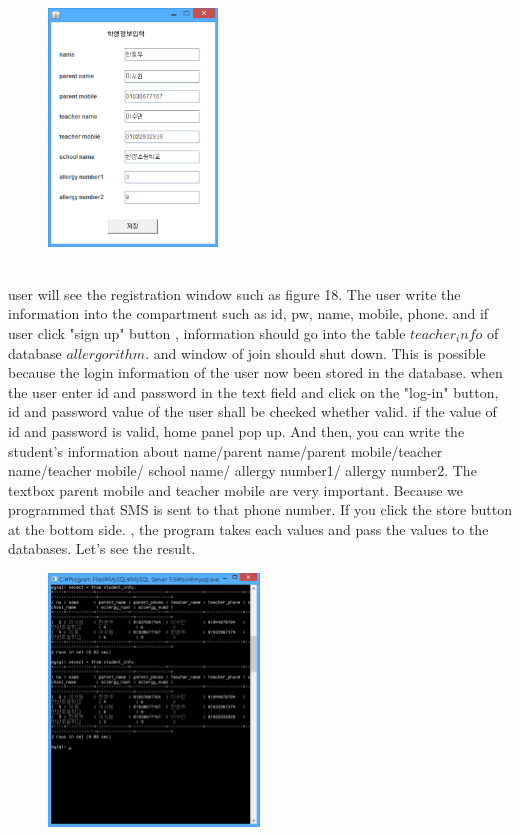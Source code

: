 \documentclass[a4paper,11pt]{IEEEtran}
\begin{document}
{{{\begin{figure}[!h]
        \centering
        \includegraphics[width=0.4\textwidth]{usec9.jpg}
        \caption{}
        \label{fig1}
\end{figure}
~\\
user will see the registration window such as figure 18. The user write the information into the compartment such as id, pw, name, mobile, phone. and if user click "sign up" button , information should go into the table $teacher_info$ of database $allergorithm$. and window of join should shut down. This is possible because the login information of the user now been stored in the database. when the user enter id and password in the text field and click on the "log-in" button, id and password value of the user shall be checked whether valid. if the value of id and password is valid, home panel pop up.
And then, you can write the student’s information about name/parent name/parent mobile/teacher name/teacher mobile/ school name/ allergy number1/ allergy number2. The textbox parent mobile and teacher mobile are very important. Because we programmed that SMS is sent to that phone number. 
If you click the store button at the bottom side. , the program takes each values and pass the values to the databases. Let’s see the result.
~\\
\begin{figure}[!h]
        \centering
        \includegraphics[width=0.5\textwidth, height=0.5\textheight]{usec10.jpg}

\end{figure}}}}
\end{document}
